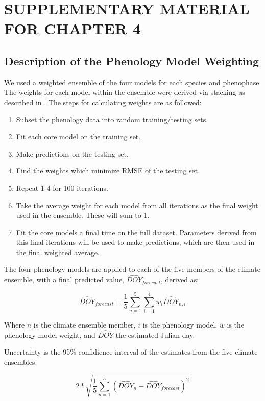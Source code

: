 \chapter{SUPPLEMENTARY MATERIAL FOR CHAPTER 4}

\section{Description of the Phenology Model Weighting}\label{appendix-a}

We used a weighted ensemble of the four models for each species and phenophase. The weights for each model within the ensemble were derived via stacking as described in \cite{dormann2018}. The steps for calculating weights are as followed:

\begin{enumerate}
    \item Subset the phenology data into random training/testing sets.
    \item Fit each core model on the training set.
    \item Make predictions on the testing set.
    \item Find the weights which minimize RMSE of the testing set.
    \item Repeat 1-4 for 100 iterations.
    \item Take the average weight for each model from all iterations as the final weight used in the ensemble. These will sum to 1.
    \item Fit the core models a final time on the full dataset. Parameters derived from this final iterations will be used to make predictions, which are then used in the final weighted average. 
\end{enumerate}

The four phenology models are applied to each of the five members of the climate ensemble, with a final predicted value, $\widehat{DOY}_{forecast}$, derived as:

$$\widehat{DOY}_{forecast} = \frac{1}{5}\sum_{n=1}^{5}\sum_{i=1}^{4}w_{i}\widehat{DOY}_{n,i}$$

Where $n$ is the climate ensemble member, $i$ is the phenology model, $w$ is the phenology model weight, and $\widehat{DOY}$ the estimated Julian day. 

Uncertainty is the 95\% confidience interval of the estimates from the five climate ensembles:

$$2 * \sqrt{\frac{1}{5}\sum_{n=1}^{5}(\widehat{DOY}_{n} - \widehat{DOY}_{forecast})^{2}}$$


